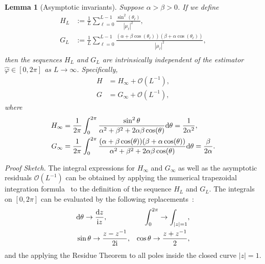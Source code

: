 \documentclass[journal,twocolumn]{IEEEtran}
\newtheorem{lemma}{\bf Lemma}
\theoremstyle{nonumberplain}
\def \ri {{\rm i}}
\def \d {{\rm d}}
\begin{document}
{\begin{lemma}[Asymptotic invariants]\label{lemma:asymp_inv}
    Suppose $\alpha > \beta > 0$. If we define 
    \begin{equation}
        \begin{aligned}
            H_L & :=\frac{1}{L}\sum_{\ell=0}^{L-1} \frac{\sin^2(\theta_\ell)}{|\mu_\ell|^2}, \\
            G_L & := \frac{1}{L}\sum_{\ell=0}^{L-1} \frac{(\alpha+\beta \cos(\theta_\ell))(\beta+\alpha\cos(\theta_\ell))}{|\mu_\ell|^2}, \\
        \end{aligned}
    \end{equation}
    then the sequences $H_L$ and $G_L$ are intrinsically independent of the estimator $\hat{\varphi}\in[0,2\pi]$ as $L\to\infty$. Specifically, 
    \begin{equation}
        \begin{aligned}
            H &= H_{\infty} + \mathcal{O}(L^{-1}), \\
            G &= G_{\infty} + \mathcal{O}(L^{-1}), 
        \end{aligned}
    \end{equation}
    where 
    \begin{equation}
        \begin{aligned}
            H_{\infty} &=  \frac{1}{2\pi}\int_{0}^{2\pi} \frac{\sin^2\theta}{\alpha^2+\beta^2+2\alpha\beta\cos(\theta)}{\rm d}\theta = \frac{1}{2\alpha^2},  \\
            G_{\infty} &= \frac{1}{2\pi}\int_{0}^{2\pi} \frac{(\alpha+\beta\cos(\theta))(\beta+\alpha\cos(\theta))}{\alpha^2+\beta^2+2\alpha\beta\cos(\theta)} {\rm d}\theta = \frac{\beta}{2\alpha}.  \\ 
        \end{aligned}
    \end{equation}
\end{lemma}

{\it Proof Sketch.} The integral expressions for $H_\infty$ and $G_\infty$ as well as the asymptotic residuals $\mathcal{O}(L^{-1})$ can be obtained by applying the numerical trapezoidal integration formula~\cite{burden2015numerical} to the definition of the sequence $H_L$ and $G_L$. The integrals on $[0,2\pi]$ can be evaluated by the following replacements~\cite{martin1966complex}:
\begin{equation}
    \begin{aligned}
        & {\rm d}\theta  \to \frac{\d z}{\ri z}, & \int_0^{2\pi} \to \int_{|z|=1}, \\
        & \sin\theta  \to \frac{z-z^{-1}}{2\ri}, & \cos\theta \to \frac{z+z^{-1}}{2}, \\
    \end{aligned}
\end{equation}
and the applying the Residue Theorem to all poles inside the closed curve $|z|=1$. 

}
\end{document}

